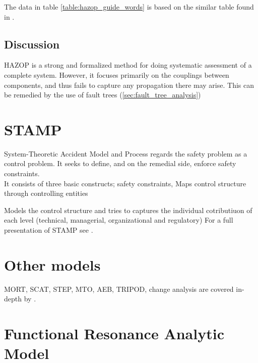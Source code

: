 \documentclass[10pt,oneside]{book}                  %
\begin{document}
The data in table \ref{table:hazop_guide_words} is based on the similar table found in \cite{storey1996safety}.

\subsection{Discussion}
HAZOP is a strong and formalized method for doing systematic assessment of a complete system. However, it focuses primarily on the couplings between components, and thus fails to capture any propagation there may arise. This can be remedied by the use of fault trees (\ref{sec:fault_tree_analysis})

\section{STAMP}
System-Theoretic Accident Model and Process regards the safety problem as a control problem. It seeks to define, and on the remedial side, enforce safety constraints.\\
It consists of three basic constructs; safety constraints, 
Maps control structure through controlling entities

Models the control structure and tries to captures the individual cotributiuon of each level (technical, managerial, organizational and regulatory)
For a full presentation of STAMP see \cite{leveson2012engineering}.

\section{Other models}
MORT, SCAT, STEP, MTO, AEB, TRIPOD, change analysis are covered in-depth by \cite{Sklet200429}.

\section{Functional Resonance Analytic Model}
\label{sec:fram}
\end{document}

